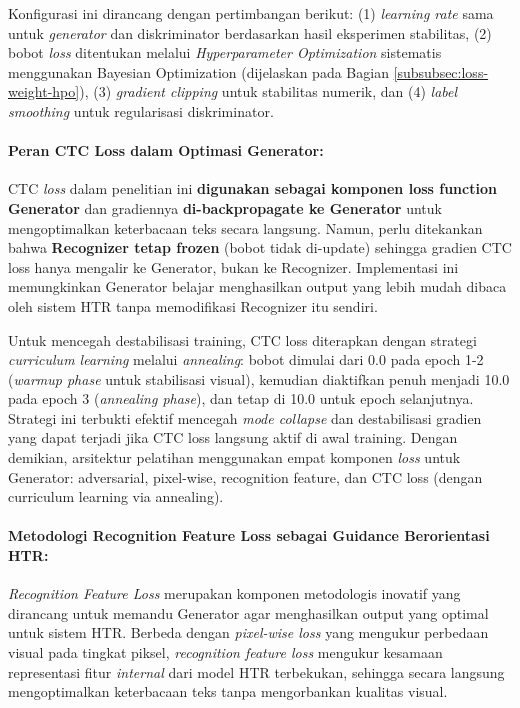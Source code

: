 \documentclass[12pt,a4paper]{article}
\begin{document}
Konfigurasi ini dirancang dengan pertimbangan berikut: (1) \textit{learning rate} sama untuk \textit{generator} dan diskriminator berdasarkan hasil eksperimen stabilitas, (2) bobot \textit{loss} ditentukan melalui \textit{Hyperparameter Optimization} sistematis menggunakan Bayesian Optimization (dijelaskan pada Bagian \ref{subsubsec:loss-weight-hpo}), (3) \textit{gradient clipping} untuk stabilitas numerik, dan (4) \textit{label smoothing} untuk regularisasi diskriminator.

\paragraph{Peran CTC Loss dalam Optimasi Generator:}
CTC \textit{loss} dalam penelitian ini \textbf{digunakan sebagai komponen loss function Generator} dan gradiennya \textbf{di-backpropagate ke Generator} untuk mengoptimalkan keterbacaan teks secara langsung. Namun, perlu ditekankan bahwa \textbf{Recognizer tetap frozen} (bobot tidak di-update) sehingga gradien CTC loss hanya mengalir ke Generator, bukan ke Recognizer. Implementasi ini memungkinkan Generator belajar menghasilkan output yang lebih mudah dibaca oleh sistem HTR tanpa memodifikasi Recognizer itu sendiri.

Untuk mencegah destabilisasi training, CTC loss diterapkan dengan strategi \textit{curriculum learning} melalui \textit{annealing}: bobot dimulai dari 0.0 pada epoch 1-2 (\textit{warmup phase} untuk stabilisasi visual), kemudian diaktifkan penuh menjadi 10.0 pada epoch 3 (\textit{annealing phase}), dan tetap di 10.0 untuk epoch selanjutnya. Strategi ini terbukti efektif mencegah \textit{mode collapse} dan destabilisasi gradien yang dapat terjadi jika CTC loss langsung aktif di awal training. Dengan demikian, arsitektur pelatihan menggunakan empat komponen \textit{loss} untuk Generator: adversarial, pixel-wise, recognition feature, dan CTC loss (dengan curriculum learning via annealing).

\paragraph{Metodologi Recognition Feature Loss sebagai Guidance Berorientasi HTR:}
\textit{Recognition Feature Loss} merupakan komponen metodologis inovatif yang dirancang untuk memandu Generator agar menghasilkan output yang optimal untuk sistem HTR. Berbeda dengan \textit{pixel-wise loss} yang mengukur perbedaan visual pada tingkat piksel, \textit{recognition feature loss} mengukur kesamaan representasi fitur \textit{internal} dari model HTR terbekukan, sehingga secara langsung mengoptimalkan keterbacaan teks tanpa mengorbankan kualitas visual.
\end{document}
